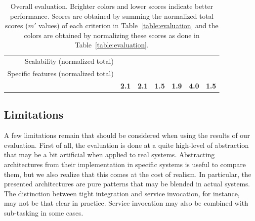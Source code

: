 \documentclass[preprint,3p,twocolumn]{elsarticle}
\begin{document}
\begin{table}
\begin{tabular}{rcccccc}
Scalability (normalized total)  & \cellcolor[HTML]{99BB99}{1.00}
                                     & \cellcolor[HTML]{99DD99}{0.50}
                                     & \cellcolor[HTML]{99DD99}{0.50}
                                     & \cellcolor[HTML]{99FF99}{0.00}
                                     & \cellcolor[HTML]{99DD99}{0.50}
                                     & \cellcolor[HTML]{99DD99}{0.50}\\
Specific features (normalized total) & \cellcolor[HTML]{99DD99}{0.50}
                                     & \cellcolor[HTML]{99DD99}{0.50}
                                     & \cellcolor[HTML]{99BB99}{1.00}
                                     & \cellcolor[HTML]{99DD99}{0.50}
                                     & \cellcolor[HTML]{99DD99}{0.50}
                                     & \cellcolor[HTML]{99FF99}{0.00}\\
                                    & \cellcolor[HTML]{99EE99}\textbf{2.1}
                                    & \cellcolor[HTML]{99EE99}\textbf{2.1}
                                    & \cellcolor[HTML]{99FF99}\textbf{1.5}
                                    & \cellcolor[HTML]{99F499}\textbf{1.9}
                                    & \cellcolor[HTML]{99BB99}\textbf{4.0}
                                    & \cellcolor[HTML]{99FF99}\textbf{1.5}\\
\end{tabular}
\caption{Overall evaluation. Brighter colors and lower scores indicate better performance. Scores
  are obtained by summing the normalized total scores ($m'$ values) of
  each criterion in Table~\ref{table:evaluation} and the colors are obtained by normalizing these scores
  as done in Table~\ref{table:evaluation}. }
\label{table:overall}
\end{table}

\subsection{Limitations}

A few limitations remain that should be considered when using the
results of our evaluation. First of all, the evaluation is done at a
quite high-level of abstraction that may be a bit artificial when
applied to real systems. Abstracting architectures from their
implementation in specific systems is useful to compare them, but we
also realize that this comes at the cost of realism.  In particular,
the presented architectures are pure patterns that may be blended in
actual systems. The distinction between tight integration and service
invocation, for instance, may not be that clear in practice. Service
invocation may also be combined with sub-tasking in some cases.
\end{document}
